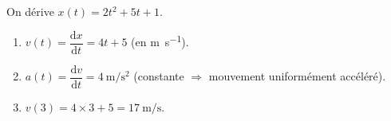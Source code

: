 \documentclass[11pt,a4paper]{article}
\begin{document}
\begin{corrige}
On dérive $x(t)=2t^2+5t+1$.
\begin{enumerate}[label=\alph*)]
  \item $v(t)=\dfrac{\mathrm{d}x}{\mathrm{d}t}=4t+5$ (en \si{\metre\per\second}).
  \item $a(t)=\dfrac{\mathrm{d}v}{\mathrm{d}t}=4\ \si{\metre\per\second\squared}$ (constante $\Rightarrow$ mouvement uniformément accéléré).
  \item $v(3)=4\times3+5=\qty{17}{\metre\per\second}$.
\end{enumerate}
\end{corrige}
\end{document}

